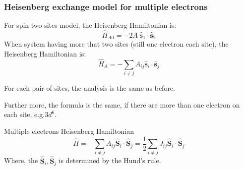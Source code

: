 \documentclass{beamer}
\begin{document}
  \begin{frame}
    \frametitle{Heisenberg exchange model for multiple electrons}
    For spin two sites model, the Heisenberg Hamiltonian is:
    \begin{equation*}
      \widehat{H}_{A\text{d}} = -2A\;\widehat{\bm{s}}_1\cdot\widehat{\bm{s}}_2
    \end{equation*}
    When system having more that two sites (still one electron each site), the Heisenberg Hamiltonian is:
    \begin{equation}
        \widehat{H}_A = -\sum_{i\ne{}j}A_{ij}\widehat{\bm{s}}_i\cdot\widehat{\bm{s}}_j
    \end{equation}
    
    For each pair of sites, the analysis is the same as before. 

    Further more, the formula is the same, if there are more than one electron on each site, e.g.\(3d^6\).
    \begin{block}{Multiple electrons Heisenberg Hamiltonian}
      \begin{equation}
        \widehat{H} = -\sum_{i\ne{}j}A_{ij}\widehat{\bm{S}}_i\cdot\widehat{\bm{S}}_j = \dfrac{1}{2}\sum_{i\ne{}j}J_{ij}\widehat{\bm{S}}_i\cdot\widehat{\bm{S}}_j
      \end{equation}
      Where, the \(\widehat{\bm{S}}_i, \widehat{\bm{S}}_j\) is determined by the Hund's rule.
    \end{block}
  \end{frame}
\end{document}
